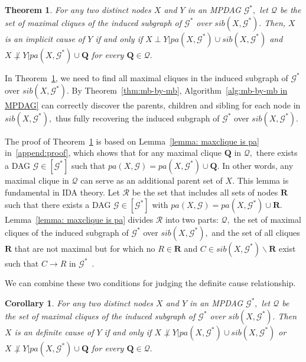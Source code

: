 \documentclass{article}
\newtheorem{theorem}{Theorem}
\newtheorem{corollary}{Corollary}
\begin{document}
\begin{theorem}
\label{thm:implicit cause}
For any two distinct nodes $X$ and $Y$ in an MPDAG $\mathcal{G}^*,$ let $\mathcal{Q}$ be the set of maximal cliques of the induced subgraph of $\mathcal{G}^*$ over $sib(X,\mathcal{G}^*).$ Then, $X$ is an implicit cause of $Y$ if and only if $X\perp Y| pa(X,\mathcal{G}^*)\cup sib(X,\mathcal{G}^*)$ and $X\not\perp Y| pa(X,\mathcal{G}^*)\cup \mathbf{Q}$ for every $\mathbf{Q}\in \mathcal{Q}.$
\end{theorem}

In Theorem~\ref{thm:implicit cause}, we need to find all maximal cliques in the induced subgraph of $\mathcal{G}^*$ over $sib(X,\mathcal{G}^*).$ By Theorem~\ref{thm:mb-by-mb}, Algorithm~\ref{alg:mb-by-mb in MPDAG} can correctly discover the parents, children and sibling for each node in $sib(X,\mathcal{G}^*),$ thus fully recovering the induced subgraph of $\mathcal{G}^*$ over $sib(X,\mathcal{G}^*).$

The proof of Theorem~\ref{thm:implicit cause} is based on Lemma~\ref{lemma: maxclique is pa} in~\ref{append:proof}, which shows that for any maximal clique $\mathbf{Q}$ in $\mathcal{Q},$ there exists a DAG $\mathcal{G}\in [\mathcal{G}^*]$ such that $pa(X,\mathcal{G})=pa(X,\mathcal{G}^*)\cup \mathbf{Q}.$ In other words, any maximal clique in $\mathcal{Q}$ can serve as an additional parent set of $X$. This lemma is fundamental in IDA theory. Let $\mathcal{R}$ be the set that includes all sets of nodes $\mathbf{R}$ such that there exists a DAG $\mathcal{G}\in [\mathcal{G}^*]$ with $pa(X,\mathcal{G})=pa(X,\mathcal{G}^*)\cup \mathbf{R}.$ Lemma~\ref{lemma: maxclique is pa} divides $\mathcal{R}$ into two parts: $\mathcal{Q},$ the set of maximal cliques of the induced subgraph of $\mathcal{G}^*$ over $sib(X,\mathcal{G}^*),$ and the set of all cliques $\mathbf{R}$ that are not maximal but for which no $R\in \mathbf{R}$ and $C\in sib(X,\mathcal{G}^*)\backslash \mathbf{R}$ exist such that $C\to R$ in $\mathcal{G}^*$~\citep{fang2020ida}.

We can combine these two conditions for judging the definite cause relationship.

\begin{corollary}
\label{cor:definite cause}
For any two distinct nodes $X$ and $Y$ in an MPDAG $\mathcal{G}^*,$ let $\mathcal{Q}$ be the set of maximal cliques of the induced subgraph of $\mathcal{G}^*$ over $sib(X,\mathcal{G}^*).$ Then $X$ is an definite cause of $Y$ if and only if $X \not\perp Y|pa(X,\mathcal{G}^*)\cup sib(X,\mathcal{G}^*)$ or $X\not\perp Y| pa(X,\mathcal{G}^*)\cup \mathbf{Q}$ for every $\mathbf{Q}\in \mathcal{Q}.$
\end{corollary}
\end{document}
